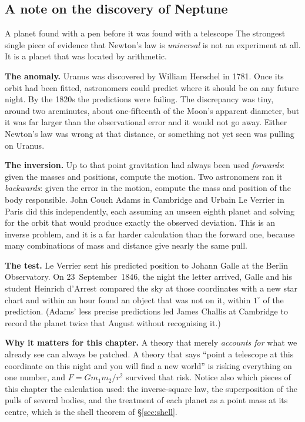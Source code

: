 \subsection*{A note on the discovery of Neptune}

\begin{remarkbox}{A planet found with a pen before it was found with a telescope}
The strongest single piece of evidence that Newton's law is \emph{universal} is not an experiment at all.
It is a planet that was located by arithmetic.

\smallskip
\textbf{The anomaly.} Uranus was discovered by William Herschel in 1781. Once its orbit had been fitted,
astronomers could predict where it should be on any future night. By the 1820s the predictions were
failing. The discrepancy was tiny, around two arcminutes, about one-fifteenth of the Moon's apparent
diameter, but it was far larger than the observational error and it would not go away. Either Newton's
law was wrong at that distance, or something not yet seen was pulling on Uranus.

\smallskip
\textbf{The inversion.} Up to that point gravitation had always been used \emph{forwards}: given the
masses and positions, compute the motion. Two astronomers ran it \emph{backwards}: given the error in
the motion, compute the mass and position of the body responsible. John Couch Adams in Cambridge and
Urbain Le Verrier in Paris did this independently, each assuming an unseen eighth planet and solving for
the orbit that would produce exactly the observed deviation. This is an inverse problem, and it is a far
harder calculation than the forward one, because many combinations of mass and distance give nearly the
same pull.

\smallskip
\textbf{The test.} Le Verrier sent his predicted position to Johann Galle at the Berlin Observatory. On
23~September~1846, the night the letter arrived, Galle and his student Heinrich d'Arrest compared the sky
at those coordinates with a new star chart and within an hour found an object that was not on it, within
$1^{\circ}$ of the prediction. (Adams' less precise predictions led James Challis at Cambridge to record
the planet twice that August without recognising it.)

\smallskip
\textbf{Why it matters for this chapter.} A theory that merely \emph{accounts for} what we already see can
always be patched. A theory that says ``point a telescope at this coordinate on this night and you will
find a new world'' is risking everything on one number, and $F=Gm_1m_2/r^{2}$ survived that risk. Notice
also which pieces of this chapter the calculation used: the inverse-square law, the superposition of the
pulls of several bodies, and the treatment of each planet as a point mass at its centre, which is the
shell theorem of \S\ref{sec:shell}.
\end{remarkbox}

